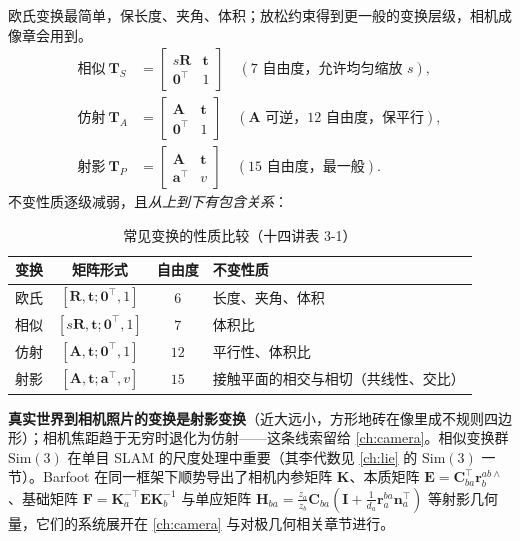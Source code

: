 欧氏变换最简单，保长度、夹角、体积；放松约束得到更一般的变换层级，相机成像章会用到\cite{gaoxiang2019slam14}。
\begin{align}
  \text{相似}\ \mathbf{T}_S&=\begin{bmatrix}s\mathbf{R}&\mathbf{t}\\\mathbf{0}^\top&1\end{bmatrix}\quad(7\text{ 自由度，允许均匀缩放 }s),\\
  \text{仿射}\ \mathbf{T}_A&=\begin{bmatrix}\mathbf{A}&\mathbf{t}\\\mathbf{0}^\top&1\end{bmatrix}\quad(\mathbf{A}\text{ 可逆，}12\text{ 自由度，保平行}),\\
  \text{射影}\ \mathbf{T}_P&=\begin{bmatrix}\mathbf{A}&\mathbf{t}\\\mathbf{a}^\top&v\end{bmatrix}\quad(15\text{ 自由度，最一般}).
\end{align}
不变性质逐级减弱，且\emph{从上到下有包含关系}：
\begin{table}[H]\centering\small
\caption{常见变换的性质比较（十四讲表 3-1）}
\label{tab:rb-transforms}
\begin{tabular}{lccl}
\toprule
变换 & 矩阵形式 & 自由度 & 不变性质 \\
\midrule
欧氏 & $[\mathbf{R},\mathbf{t};\mathbf{0}^\top,1]$ & $6$ & 长度、夹角、体积 \\
相似 & $[s\mathbf{R},\mathbf{t};\mathbf{0}^\top,1]$ & $7$ & 体积比 \\
仿射 & $[\mathbf{A},\mathbf{t};\mathbf{0}^\top,1]$ & $12$ & 平行性、体积比 \\
射影 & $[\mathbf{A},\mathbf{t};\mathbf{a}^\top,v]$ & $15$ & 接触平面的相交与相切（共线性、交比）\\
\bottomrule
\end{tabular}
\end{table}

\noindent\textbf{真实世界到相机照片的变换是射影变换}（近大远小，方形地砖在像里成不规则四边形）；相机焦距趋于无穷时退化为仿射——这条线索留给 \cref{ch:camera}。相似变换群 $\mathrm{Sim}(3)$ 在单目 SLAM 的尺度处理中重要（其李代数见 \cref{ch:lie} 的 $\mathrm{Sim}(3)$ 一节）。Barfoot 在同一框架下顺势导出了相机内参矩阵 $\mathbf{K}$、本质矩阵 $\mathbf{E}=\mathbf{C}_{ba}^\top\mathbf{r}_b^{ab\wedge}$、基础矩阵 $\mathbf{F}=\mathbf{K}_a^{-\top}\mathbf{E}\mathbf{K}_b^{-1}$ 与单应矩阵 $\mathbf{H}_{ba}=\tfrac{z_a}{z_b}\mathbf{C}_{ba}(\mathbf{I}+\tfrac{1}{d_a}\mathbf{r}_a^{ba}\mathbf{n}_a^\top)$ 等射影几何量\cite{barfoot2024state}，它们的系统展开在 \cref{ch:camera} 与对极几何相关章节进行。

